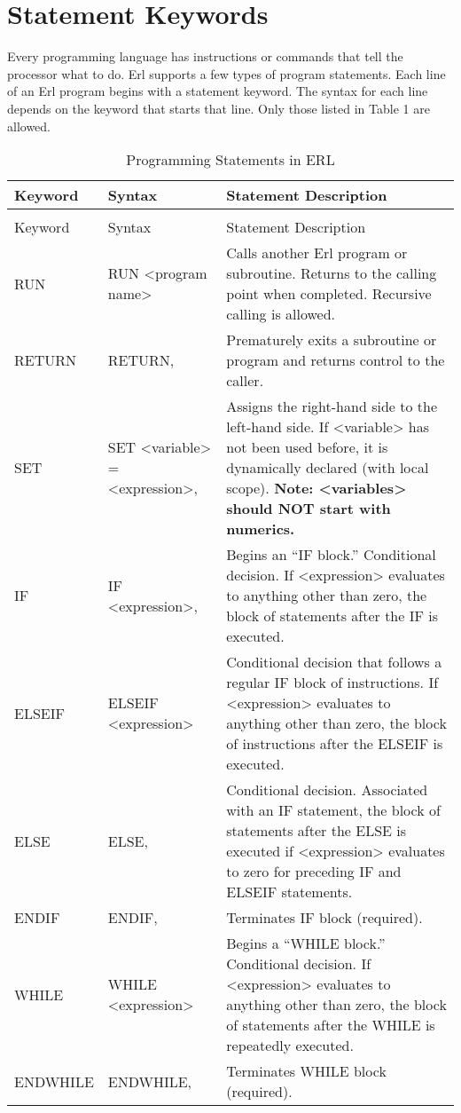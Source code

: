 \section{Statement Keywords}\label{statement-keywords}

Every programming language has instructions or commands that tell the processor what to do. Erl supports a few types of program statements. Each line of an Erl program begins with a statement keyword. The syntax for each line depends on the keyword that starts that line. Only those listed in Table 1 are allowed.

\begin{longtable}{@{}ll>{\raggedright}p{3in}@{}}

\caption{Programming Statements in ERL \label{table:programming-statements-in-erl}} \tabularnewline
\toprule
Keyword & Syntax & Statement Description \tabularnewline
\midrule
\endfirsthead

\caption[]{Programming Statements in ERL} \tabularnewline
\toprule
Keyword & Syntax & Statement Description \tabularnewline
\midrule
\endhead

RUN & RUN <program name> & Calls another Erl program or subroutine. Returns to the calling point when completed. Recursive calling is allowed. \tabularnewline
RETURN & RETURN, & Prematurely exits a subroutine or program and returns control to the caller. \tabularnewline
SET & SET <variable> = <expression>, & Assigns the right-hand side to the left-hand side. If <variable> has not been used before, it is dynamically declared (with local scope). \textbf{Note: <variables> should NOT start with numerics.} \tabularnewline
IF & IF <expression>, & Begins an ``IF block.'' Conditional decision. If <expression> evaluates to anything other than zero, the block of statements after the IF is executed. \tabularnewline
ELSEIF & ELSEIF <expression> & Conditional decision that follows a regular IF block of instructions. If <expression> evaluates to anything other than zero, the block of instructions after the ELSEIF is executed. \tabularnewline
ELSE & ELSE, & Conditional decision. Associated with an IF statement, the block of statements after the ELSE is executed if <expression> evaluates to zero for preceding IF and ELSEIF statements. \tabularnewline
ENDIF & ENDIF, & Terminates IF block (required). \tabularnewline
WHILE & WHILE <expression> & Begins a ``WHILE block.'' Conditional decision. If <expression> evaluates to anything other than zero, the block of statements after the WHILE is repeatedly executed. \tabularnewline
ENDWHILE & ENDWHILE, & Terminates WHILE block (required). \tabularnewline
\bottomrule
\end{longtable}

